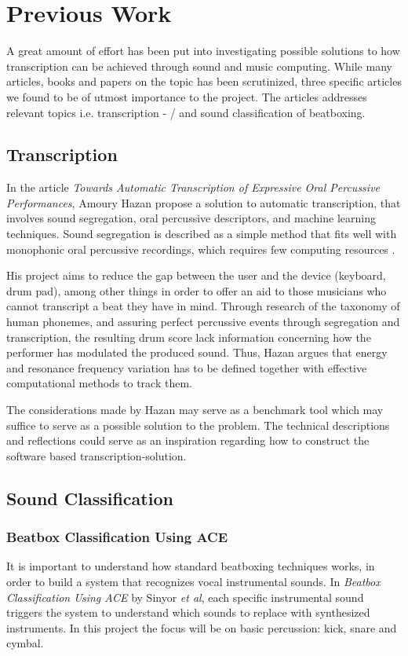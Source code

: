 \section{Previous Work}
A great amount of effort has been put into investigating possible solutions to how transcription can be achieved through sound and music computing. While many articles, books and papers on the topic has been scrutinized, three specific articles we found to be of utmost importance to the project. The articles addresses relevant topics i.e. transcription - / and sound classification of beatboxing.

\subsection{Transcription}
In the article \textit{Towards Automatic Transcription of Expressive Oral Percussive Performances}, Amoury Hazan propose a solution to automatic transcription, that involves sound segregation, oral percussive descriptors, and machine learning techniques. Sound segregation is described as a simple method that fits well with monophonic oral percussive recordings, which requires few computing resources \citep{Hazan2005a}.	

His project aims to reduce the gap between the user and the device (keyboard, drum pad), among other things in order to offer an aid to those musicians who cannot transcript a beat they have in mind.
Through research of the taxonomy of human phonemes, and assuring perfect percussive events through segregation and transcription, the resulting drum score lack information concerning how the performer has modulated the produced sound. Thus, Hazan argues that energy and resonance frequency variation has to be defined together with effective computational methods to track them.
	
The considerations made by Hazan may serve as a benchmark tool which may suffice to serve as a possible solution to the problem. The technical descriptions and reflections could serve as an inspiration regarding how to construct the software based transcription-solution.

\subsection{Sound Classification}

\subsubsection{Beatbox Classification Using ACE}
It is important to understand how standard beatboxing techniques works, in order to build a system that recognizes vocal instrumental sounds. In \textit{Beatbox Classification Using ACE} by Sinyor \textit{et al}, each specific instrumental sound triggers the system to understand which sounds to replace with synthesized instruments. In this project the focus will be on basic percussion: kick, snare and cymbal.

